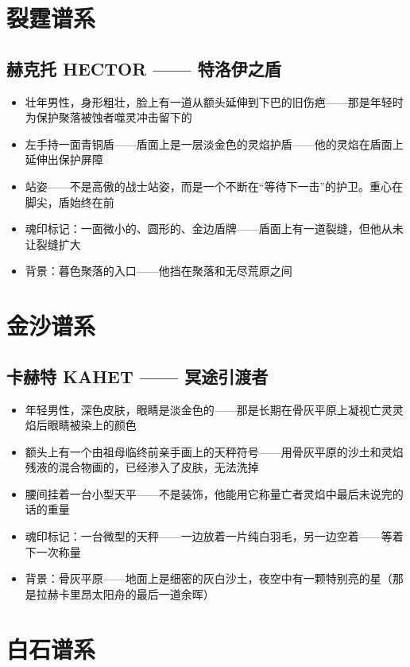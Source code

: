 \documentclass[12pt,a4paper,openany]{ctexbook}
\begin{document}
\section{裂霆谱系}

\subsection{赫克托 HECTOR —— 特洛伊之盾}
\begin{itemize}
    \item 壮年男性，身形粗壮，脸上有一道从额头延伸到下巴的旧伤疤——那是年轻时为保护聚落被蚀者噬灵冲击留下的
    \item 左手持一面青铜盾——盾面上是一层淡金色的灵焰护盾——他的灵焰在盾面上延伸出保护屏障
    \item 站姿——不是高傲的战士站姿，而是一个不断在“等待下一击”的护卫。重心在脚尖，盾始终在前
    \item 魂印标记：一面微小的、圆形的、金边盾牌——盾面上有一道裂缝，但他从未让裂缝扩大
    \item 背景：暮色聚落的入口——他挡在聚落和无尽荒原之间
\end{itemize}

\section{金沙谱系}

\subsection{卡赫特 KAHET —— 冥途引渡者}
\begin{itemize}
    \item 年轻男性，深色皮肤，眼睛是淡金色的——那是长期在骨灰平原上凝视亡灵灵焰后眼睛被染上的颜色
    \item 额头上有一个由祖母临终前亲手画上的天秤符号——用骨灰平原的沙土和灵焰残液的混合物画的，已经渗入了皮肤，无法洗掉
    \item 腰间挂着一台小型天平——不是装饰，他能用它称量亡者灵焰中最后未说完的话的重量
    \item 魂印标记：一台微型的天秤——一边放着一片纯白羽毛，另一边空着——等着下一次称量
    \item 背景：骨灰平原——地面上是细密的灰白沙土，夜空中有一颗特别亮的星（那是拉赫卡里昂太阳舟的最后一道余晖）
\end{itemize}

\section{白石谱系}
\end{document}
